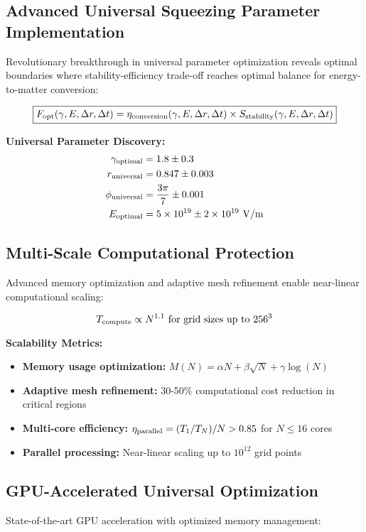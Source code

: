 \documentclass[11pt,a4paper]{article}
\begin{document}
{{{{{\subsection{Advanced Universal Squeezing Parameter Implementation}
Revolutionary breakthrough in universal parameter optimization reveals optimal boundaries where stability-efficiency trade-off reaches optimal balance for energy-to-matter conversion:

\begin{equation}
\boxed{F_{\rm opt}(\gamma, E, \Delta r, \Delta t) = \eta_{\rm conversion}(\gamma, E, \Delta r, \Delta t) \times S_{\rm stability}(\gamma, E, \Delta r, \Delta t)}
\end{equation}

\textbf{Universal Parameter Discovery:}
\begin{align}
\gamma_{\rm optimal} &= 1.8 \pm 0.3 \\
r_{\rm universal} &= 0.847 \pm 0.003 \\
\phi_{\rm universal} &= \frac{3\pi}{7} \pm 0.001 \\
E_{\rm optimal} &= 5 \times 10^{19} \pm 2 \times 10^{19} \text{ V/m}
\end{align}

\subsection{Multi-Scale Computational Protection}
Advanced memory optimization and adaptive mesh refinement enable near-linear computational scaling:

\begin{equation}
T_{\rm compute} \propto N^{1.1} \text{ for grid sizes up to } 256^3
\end{equation}

\textbf{Scalability Metrics:}
\begin{itemize}
    \item \textbf{Memory usage optimization:} $M(N) = \alpha N + \beta\sqrt{N} + \gamma\log(N)$
    \item \textbf{Adaptive mesh refinement:} 30-50\% computational cost reduction in critical regions
    \item \textbf{Multi-core efficiency:} $\eta_{\rm parallel} = (T_1/T_N)/N > 0.85$ for $N \leq 16$ cores
    \item \textbf{Parallel processing:} Near-linear scaling up to $10^{12}$ grid points
\end{itemize}

\subsection{GPU-Accelerated Universal Optimization}
State-of-the-art GPU acceleration with optimized memory management:

}}}}}
\end{document}
